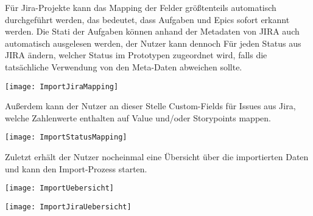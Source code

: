 Für Jira-Projekte kann das Mapping der Felder größtenteils automatisch durchgeführt werden, das bedeutet, dass Aufgaben und Epics sofort erkannt werden. Die Stati der Aufgaben können anhand der Metadaten von JIRA auch automatisch ausgelesen werden, der Nutzer kann dennoch Für jeden Status aus JIRA ändern, welcher Status im Prototypen zugeordnet wird, falls die tatsächliche Verwendung von den Meta-Daten abweichen sollte.

\vspace{20pt}
\begin{center}
    \begin{minipage}{1\linewidth}
        \texttt{[image: ImportJiraMapping]}
    \end{minipage}
\end{center}
\vspace{20pt}

Außerdem kann der Nutzer an dieser Stelle Custom-Fields für Issues aus Jira, welche Zahlenwerte enthalten auf Value und/oder Storypoints mappen.

\vspace{20pt}
\begin{center}
    \begin{minipage}{1\linewidth}
        \texttt{[image: ImportStatusMapping]}
    \end{minipage}
\end{center}
\vspace{20pt}

Zuletzt erhält der Nutzer nocheinmal eine Übersicht über die importierten Daten und kann den Import-Prozess starten.

\vspace{20pt}
\begin{center}
    \begin{minipage}{1\linewidth}
        \texttt{[image: ImportUebersicht]}
    \end{minipage}
\end{center}
\vspace{20pt}

\vspace{20pt}
\begin{center}
    \begin{minipage}{1\linewidth}
        \texttt{[image: ImportJiraUebersicht]}
    \end{minipage}
\end{center}
\vspace{20pt}

